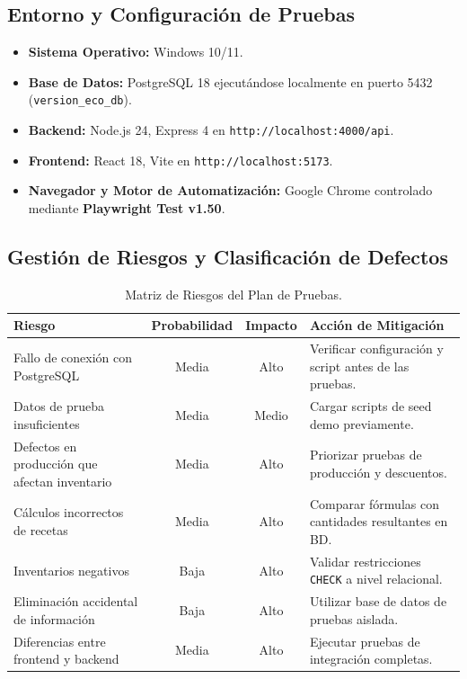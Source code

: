 \documentclass[11pt,a4paper]{article}
\begin{document}
\subsection{Entorno y Configuración de Pruebas}
\begin{itemize}
    \item \textbf{Sistema Operativo:} Windows 10/11.
    \item \textbf{Base de Datos:} PostgreSQL 18 ejecutándose localmente en puerto 5432 (\texttt{version\_eco\_db}).
    \item \textbf{Backend:} Node.js 24, Express 4 en \texttt{http://localhost:4000/api}.
    \item \textbf{Frontend:} React 18, Vite en \texttt{http://localhost:5173}.
    \item \textbf{Navegador y Motor de Automatización:} Google Chrome controlado mediante \textbf{Playwright Test v1.50}.
\end{itemize}

\subsection{Gestión de Riesgos y Clasificación de Defectos}
\begin{table}[htbp]
\centering
\small
\begin{tabularx}{\textwidth}{p{4.2cm} c c X}
\toprule
\textbf{Riesgo} & \textbf{Probabilidad} & \textbf{Impacto} & \textbf{Acción de Mitigación} \\
\midrule
Fallo de conexión con PostgreSQL & Media & Alto & Verificar configuración y script antes de las pruebas. \\
Datos de prueba insuficientes & Media & Medio & Cargar scripts de seed demo previamente. \\
Defectos en producción que afectan inventario & Media & Alto & Priorizar pruebas de producción y descuentos. \\
Cálculos incorrectos de recetas & Media & Alto & Comparar fórmulas con cantidades resultantes en BD. \\
Inventarios negativos & Baja & Alto & Validar restricciones \texttt{CHECK} a nivel relacional. \\
Eliminación accidental de información & Baja & Alto & Utilizar base de datos de pruebas aislada. \\
Diferencias entre frontend y backend & Media & Alto & Ejecutar pruebas de integración completas. \\
\bottomrule
\end{tabularx}
\caption{Matriz de Riesgos del Plan de Pruebas.}
\end{table}
\end{document}
